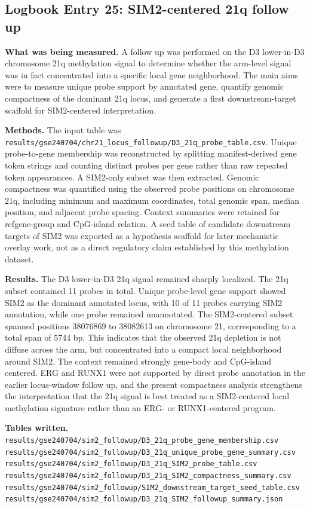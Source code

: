 \subsection*{Logbook Entry 25: SIM2-centered 21q follow up}

\textbf{What was being measured.}
A follow up was performed on the D3 lower-in-D3 chromosome 21q methylation signal to determine whether the arm-level signal was in fact concentrated into a specific local gene neighborhood. The main aims were to measure unique probe support by annotated gene, quantify genomic compactness of the dominant 21q locus, and generate a first downstream-target scaffold for SIM2-centered interpretation.

\textbf{Methods.}
The input table was
\texttt{results/gse240704/chr21\_locus\_followup/D3\_21q\_probe\_table.csv}.
Unique probe-to-gene membership was reconstructed by splitting manifest-derived gene token strings and counting distinct probes per gene rather than raw repeated token appearances. A SIM2-only subset was then extracted. Genomic compactness was quantified using the observed probe positions on chromosome 21q, including minimum and maximum coordinates, total genomic span, median position, and adjacent probe spacing. Context summaries were retained for refgene-group and CpG-island relation. A seed table of candidate downstream targets of SIM2 was exported as a hypothesis scaffold for later mechanistic overlay work, not as a direct regulatory claim established by this methylation dataset.

\textbf{Results.}
The D3 lower-in-D3 21q signal remained sharply localized. The 21q subset contained 11 probes in total. Unique probe-level gene support showed SIM2 as the dominant annotated locus, with 10 of 11 probes carrying SIM2 annotation, while one probe remained unannotated. The SIM2-centered subset spanned positions 38076869 to 38082613 on chromosome 21, corresponding to a total span of 5744 bp. This indicates that the observed 21q depletion is not diffuse across the arm, but concentrated into a compact local neighborhood around SIM2. The context remained strongly gene-body and CpG-island centered. ERG and RUNX1 were not supported by direct probe annotation in the earlier locus-window follow up, and the present compactness analysis strengthens the interpretation that the 21q signal is best treated as a SIM2-centered local methylation signature rather than an ERG- or RUNX1-centered program.

\textbf{Tables written.}
\texttt{results/gse240704/sim2_followup/D3_21q_probe_gene_membership.csv}\\
\texttt{results/gse240704/sim2_followup/D3_21q_unique_probe_gene_summary.csv}\\
\texttt{results/gse240704/sim2_followup/D3_21q_SIM2_probe_table.csv}\\
\texttt{results/gse240704/sim2_followup/D3_21q_SIM2_compactness_summary.csv}\\
\texttt{results/gse240704/sim2_followup/SIM2_downstream_target_seed_table.csv}\\
\texttt{results/gse240704/sim2_followup/D3_21q_SIM2_followup_summary.json}

